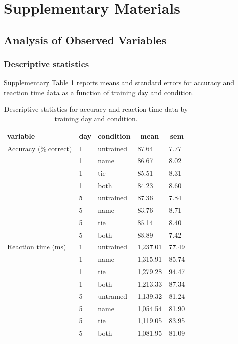 \documentclass[
  english,
  man,floatsintext]{apa6}
\author{\phantom{0}}
\date{}
\affiliation{\phantom{0}}
\begin{document}
\renewcommand{\figurename}{Supplementary Figure}
\renewcommand{\tablename}{Supplemetentary Table}

\section{Supplementary Materials}\label{supplementary-materials}

\subsection{Analysis of Observed Variables}\label{analysis-of-observed-variables}

\subsubsection{Descriptive statistics}\label{descriptive-statistics}

Supplementary Table 1 reports means and standard errors for accuracy and reaction time data as a function of training day and condition.



\begin{table}[tbp]

\begin{center}
\begin{threeparttable}

\caption{\label{tab:descriptive-table}Descriptive statistics for accuracy and reaction time data by training day and condition.}

\begin{tabular}{lllll}
\toprule
variable & \multicolumn{1}{c}{day} & \multicolumn{1}{c}{condition} & \multicolumn{1}{c}{mean} & \multicolumn{1}{c}{sem}\\
\midrule
Accuracy (\% correct) & 1 & untrained & 87.64 & 7.77\\
 & 1 & name & 86.67 & 8.02\\
 & 1 & tie & 85.51 & 8.31\\
 & 1 & both & 84.23 & 8.60\\
 & 5 & untrained & 87.36 & 7.84\\
 & 5 & name & 83.76 & 8.71\\
 & 5 & tie & 85.14 & 8.40\\
 & 5 & both & 88.89 & 7.42\\
Reaction time (ms) & 1 & untrained & 1,237.01 & 77.49\\
 & 1 & name & 1,315.91 & 85.74\\
 & 1 & tie & 1,279.28 & 94.47\\
 & 1 & both & 1,213.33 & 87.34\\
 & 5 & untrained & 1,139.32 & 81.24\\
 & 5 & name & 1,054.54 & 81.90\\
 & 5 & tie & 1,119.05 & 83.95\\
 & 5 & both & 1,081.95 & 81.09\\
\bottomrule
\end{tabular}

\end{threeparttable}
\end{center}

\end{table}
\end{document}
